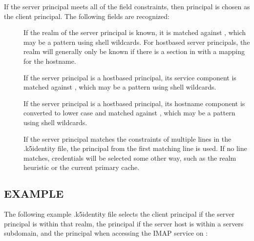 \documentclass[letterpaper,10pt,english]{sphinxmanual}
\begin{document}
\sphinxAtStartPar
If the server principal meets all of the field constraints, then
principal is chosen as the client principal.  The following fields are
recognized:
\begin{description}
\item[{}] \leavevmode
\sphinxAtStartPar
If the realm of the server principal is known, it is matched
against , which may be a pattern using shell wildcards.
For host\sphinxhyphen{}based server principals, the realm will generally only be
known if there is a  section in
 with a mapping for the hostname.

\item[{}] \leavevmode
\sphinxAtStartPar
If the server principal is a host\sphinxhyphen{}based principal, its service
component is matched against , which may be a pattern using
shell wildcards.

\item[{}] \leavevmode
\sphinxAtStartPar
If the server principal is a host\sphinxhyphen{}based principal, its hostname
component is converted to lower case and matched against ,
which may be a pattern using shell wildcards.

\sphinxAtStartPar
If the server principal matches the constraints of multiple lines
in the .k5identity file, the principal from the first matching
line is used.  If no line matches, credentials will be selected
some other way, such as the realm heuristic or the current primary
cache.

\end{description}


\subsection{EXAMPLE}
\label{\detokenize{user/user_config/k5identity:example}}
\sphinxAtStartPar
The following example .k5identity file selects the client principal
 if the server principal is within that realm,
the principal  if the server host is within
a servers subdomain, and the principal  when
accessing the IMAP service on :

\begin{sphinxVerbatim}[commandchars=\\\{\}]
       
  
   
\end{sphinxVerbatim}
\end{document}
